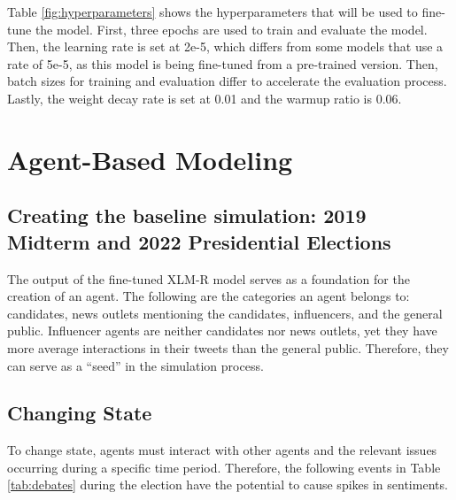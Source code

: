 Table \ref{fig:hyperparameters} shows the hyperparameters that will be used to fine-tune the model. First, three epochs are used to train and evaluate the model. Then, the learning rate is set at 2e-5, which differs from some models that use a rate of 5e-5, as this model is being fine-tuned from a pre-trained version. Then, batch sizes for training and evaluation differ to accelerate the evaluation process. Lastly, the weight decay rate is set at 0.01 and the warmup ratio is 0.06.

\section{Agent-Based Modeling}
\subsection{Creating the baseline simulation: 2019 Midterm and 2022 Presidential Elections}
The output of the fine-tuned XLM-R model serves as a foundation for the creation of an agent. The following are the categories an agent belongs to: candidates, news outlets mentioning the candidates, influencers, and the general public. Influencer agents are neither candidates nor news outlets, yet they have more average interactions in their tweets than the general public. Therefore, they can serve as a “seed” in the simulation process.

\subsection{Changing State}
To change state, agents must interact with other agents and the relevant issues occurring during a specific time period.  Therefore, the following events in Table \ref{tab:debates} during the election have the potential to cause spikes in sentiments.

\clearpage


